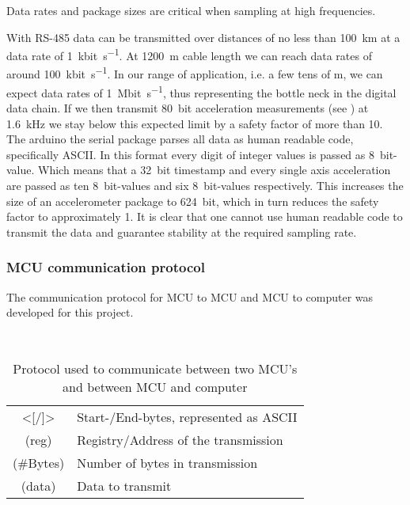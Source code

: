 Data rates and package sizes are critical when sampling at high frequencies. 

With \ac{RS}-485 data can be transmitted over distances of no less than \SI{100}{\km} at a data rate of \SI{1}{\kilo bit\per\second}. At \SI{1200}{\meter} cable length we can reach data rates of around \SI{100}{\kilo bit\per\second}. In our range of application, i.e. a few tens of \si{\meter}, we can expect data rates of \SI{1}{\mega bit\per\second}, thus representing the bottle neck in the digital data chain. If we then transmit \SI{80}{bit} acceleration measurements (see ) at \SI{1.6}{\kilo\hertz} we stay below this expected limit by a safety factor of more than 10.
The arduino the serial package parses all data as human readable code, specifically \acf{ASCII}. In this format every digit of integer values is passed as \SI{8}{bit}-value. Which means that a \SI{32}{bit} timestamp and every single axis acceleration are passed as ten \SI{8}{bit}-values and six \SI{8}{bit}-values respectively. This increases the size of an accelerometer package to \SI{624}{bit}, which in turn reduces the safety factor to approximately 1.
It is clear that one cannot use human readable code to transmit the data and guarantee stability at the required sampling rate.


\subsubsection{MCU communication protocol}

The communication protocol for \ac{MCU} to \ac{MCU} and \ac{MCU} to computer was developed for this project.

\begin{table}[!htb]
    \centering
    
    \\[0.5em]
    \footnotesize
		\begin{tabular}{c@{ :\hskip 0.5em}l}
			\toprule
            \large{\textcolor{WesMixL8qual6}{<[}/\textcolor{WesMixL8qual6}{]>}} & Start-/End-bytes, represented as \ac{ASCII}\\
            \textcolor{WesMixL8qual0}{\large (reg)} & Registry/Address of the transmission\\
            \textcolor{WesMixL8qual4}{\large (\#Bytes)} & Number of bytes in transmission\\
            \textcolor{WesMixL8qual5}{\large (data)} & Data to transmit\\
			\bottomrule
		\end{tabular}
	\normalsize
    \caption[MCU communication protocol]{Protocol used to communicate between two MCU's and between MCU and computer}
    \label{tab:mcu_com_protocol}
\end{table}

